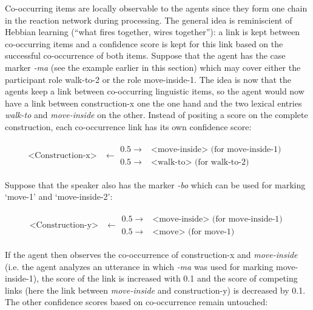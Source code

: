 Co-occurring items are locally observable to the agents since they form one chain in the reaction network during processing. The general idea is reminiscient of Hebbian learning (``what fires together, wires together''): a link is kept between co-occurring items and a confidence score is kept for this link based on the successful co-occurrence of both items. Suppose that the agent has the case marker {\em -ma} (see the example earlier in this section) which may cover either the participant role walk-to-2 or the role move-inside-1. The idea is now that the agents keep a link between co-occurring linguistic items, so the agent would now have a link between construction-x one the one hand and the two lexical entries {\em walk-to} and {\em move-inside} on the other. Instead of positing a score on the complete construction, each co-occurrence link has its own confidence score: 

\ea
\parbox{\textwidth}{
  \begin{align*}
  \text{<Construction-x>} & \leftarrow  
  \begin{array}{ll} 
  0.5 \rightarrow & \text{<move-inside> (for move-inside-1) }\\
  0.5 \rightarrow & \text{<walk-to> (for walk-to-2)}
  \end{array}
  \end{align*}
}
\z

Suppose that the speaker also has the marker {\em -bo} which can be used for marking `move-1' and `move-inside-2':

\ea
\parbox{\textwidth}{
  \begin{align*}
  \text{<Construction-y>} & \leftarrow  
  \begin{array}{ll} 
  0.5 \rightarrow & \text{<move-inside> (for move-inside-1)} \\
  0.5 \rightarrow & \text{<move> (for move-1)}
  \end{array}
  \end{align*}
  }
\z

If the agent then observes the co-occurrence of construction-x and {\em move-inside} (i.e. the agent analyzes an utterance in which {\em -ma} was used for marking move-inside-1), the score of the link is increased with 0.1 and the score of competing links (here the link between {\em move-inside} and construction-y) is decreased by 0.1. The other confidence scores based on co-occurrence remain untouched:

